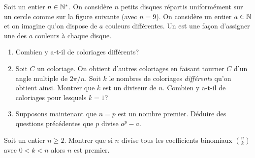 \begin{td-exo} %
	Soit un entier $n\in\mathbb{N}^\ast$. On considère $n$ petits disques répartis uniformément sur un cercle
	comme sur la figure suivante (avec $n=9$). On considère un entier $a\in \mathbb{N}$ et on imagine qu'on 
	dispose de $a$ couleurs différentes. Un  est une façon d'assigner une des $a$ couleurs 
	à chaque disque.\\
	
	
	
	\begin{enumerate}[1)]
		\item Combien y a-t-il de coloriages différents?
		
		\item Soit $C$ un coloriage. On obtient d'autres coloriages en faisant tourner $C$ d'un angle multiple de $2\pi/n$. Soit $k$ le nombres de coloriages \emph{différents} qu'on obtient ainsi. Montrer que $k$ est un diviseur de $n$. Combien y a-t-il de coloriages pour lesquels $k=1$?
		
		\item Supposons maintenant que $n=p$ est un nombre premier. Déduire des questions précédentes que $p$ divise $a^p-a$.
		
	\end{enumerate}
	
\end{td-exo}

\begin{td-exo} %
	Soit un entier $n\ge 2$. Montrer que si $n$ divise tous les coefficients binomiaux $\binom nk$ 
	avec $0<k<n$ alors $n$ est premier.
	
\end{td-exo}

